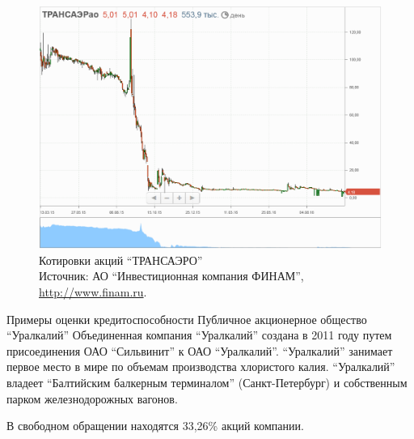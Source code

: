 \documentclass[_Banking_p2.tex]{subfiles}
\begin{document}
\begin{frame}{}
\begin{figure}	
\centering
\includegraphics[scale=0.3]{img/TAER_quotes.png}
\caption{Котировки акций ``ТРАНСАЭРО''\\ 
Источник: АО ``Инвестиционная компания ФИНАМ'', \url{http://www.finam.ru}.}\label{fig:TAER_quotes}
\end{figure}

\end{frame}

\begin{frame}{Примеры оценки кредитоспособности}
{ Публичное акционерное общество ``Уралкалий''}
Объединенная компания ``Уралкалий'' создана в 2011 году путем присоединения ОАО ``Сильвинит'' к ОАО ``Уралкалий''. ``Уралкалий'' занимает первое место в мире по объемам производства хлористого калия. ``Уралкалий'' владеет ``Балтийским балкерным терминалом'' (Санкт-Петербург) и собственным парком железнодорожных вагонов. 

В свободном обращении находятся 33,26\% акций компании.
\end{frame}
\end{document}
